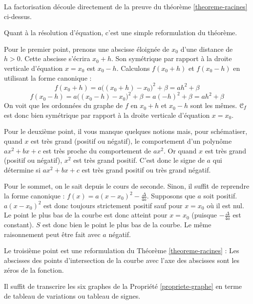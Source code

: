 \documentclass[cours]{lycee-deveaux}
\begin{document}
\begin{preuve}
  La factorisation découle directement de la preuve du théorème \ref{theoreme-racines} ci-dessus.

  Quant à la résolution d'équation, c'est une simple reformulation du théorème.
\end{preuve}

\begin{preuve}
  \indent
  Pour le premier point, prenons une abscisse éloignée de $x_0$ d'une distance de $h>0$.
  Cette abscisse s'écrira $x_0+h$.
  Son symétrique par rapport à la droite verticale d'équation $x=x_0$ est $x_0-h$.
  Calculons $f(x_0+h)$ et $f(x_0-h)$ en utilisant la forme canonique :
  \[
  f(x_0+h) = a\Big((x_0+h)-x_0\big)^2+\beta = ah^2+\beta
  \]
  \[
  f(x_0-h) = a\Big((x_0-h)-x_0\big)^2+\beta = a(-h)^2+\beta = ah^2+\beta
  \]
  On voit que les ordonnées du graphe de $f$ en $x_0+h$ et $x_0-h$ sont les mêmes.
  $\mathcal{C}_f$ est donc bien symétrique par rapport à la droite verticale d'équation $x=x_0$.
  
  Pour le deuxième point, il vous manque quelques notions mais, pour schématiser, quand $x$ est très grand (positif ou négatif),
  le comportement d'un polynôme $ax^2+bx+c$ est très proche du comportement de $ax^2$.
  Or quand $x$ est très grand (positif ou négatif), $x^2$ est très grand positif. C'est donc le signe de $a$ qui détermine
  si $ax^2+bx+c$ est très grand positif ou très grand négatif.

  Pour le sommet, on le sait depuis le cours de seconde. Sinon, il suffit de reprendre la forme canonique :
  $f(x) = a(x-x_0)^2-\frac{\Delta}{4a}$. Supposons que $a$ soit positif. $a(x-x_0)^2$ est donc toujours strictement positif
  sauf pour $x=x_0$ où il est nul. Le point le plus bas de la courbe est donc atteint pour $x=x_0$ (puisque $-\frac{\Delta}{4a}$
  est constant). $S$ est donc bien le point le plus bas de la courbe. Le même raisonnement peut être fait avec $a$ négatif.

  Le troisième point est une reformulation du Théorème \ref{theoreme-racines} :
  Les abscisses des points d'intersection de la courbe avec l'axe des abscisses sont les zéros de la fonction.
\end{preuve}

\begin{preuve}
  Il suffit de transcrire les six graphes de la Propriété \ref{propriete-graphe}
  en terme de tableau de variations ou tableau de signes.
\end{preuve}
\end{document}
